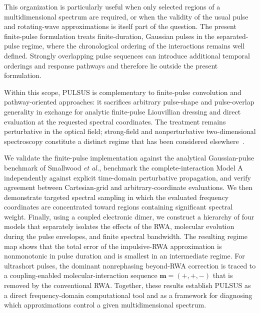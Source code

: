 This organization is particularly useful when only selected regions
of a multidimensional spectrum are required, or when the validity of
the usual pulse and rotating-wave approximations is itself part of the
question. The present finite-pulse formulation treats finite-duration,
Gaussian pulses in the separated-pulse regime, where the chronological
ordering of the interactions remains well defined. Strongly overlapping
pulse sequences can introduce additional temporal orderings and response
pathways and therefore lie outside the present formulation.

Within this scope, PULSUS is complementary to finite-pulse convolution
and pathway-oriented approaches: it sacrifices arbitrary pulse-shape
and pulse-overlap generality in exchange for analytic finite-pulse
Liouvillian dressing and direct evaluation at the requested spectral
coordinates. The treatment remains perturbative in the optical field;
strong-field and nonperturbative two-dimensional spectroscopy constitute
a distinct regime that has been considered elsewhere~\cite{
AndaCole2021BeyondPerturbative,
BressanVanThor2021IntenseFields}.

We validate the finite-pulse implementation against the analytical
Gaussian-pulse benchmark of Smallwood \textit{et al.}, benchmark the
complete-interaction Model A independently against explicit
time-domain perturbative propagation, and verify agreement between
Cartesian-grid and arbitrary-coordinate evaluations.
We then demonstrate targeted spectral sampling in which the evaluated
frequency coordinates are concentrated toward regions containing
significant spectral weight.
Finally, using a coupled electronic dimer, we construct a hierarchy of
four models that separately isolates the effects of the RWA,
molecular evolution during the pulse envelopes, and finite spectral
bandwidth.
The resulting regime map shows that the total error of the
impulsive-RWA approximation is nonmonotonic in pulse duration and is
smallest in an intermediate regime.
For ultrashort pulses, the dominant
nonrephasing beyond-RWA correction is traced to a coupling-enabled
molecular-interaction sequence
$\mathbf{m}=(+,+,-)$ that is removed by the conventional RWA.
Together, these results establish PULSUS as a direct
frequency-domain computational tool and as a framework for diagnosing
which approximations control a given multidimensional spectrum.